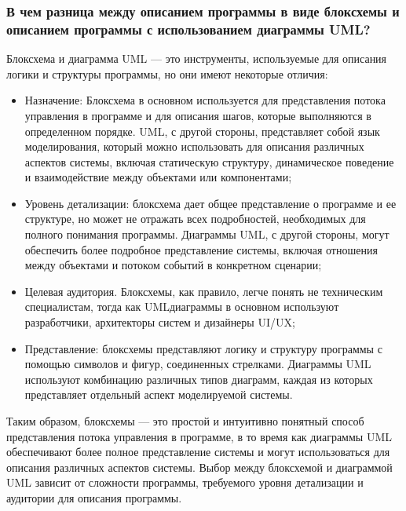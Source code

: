\documentclass[letterpaper,10pt,russian]{sphinxmanual}
\begin{document}
\subsubsection{В чем разница между описанием программы в виде блок\sphinxhyphen{}схемы и описанием программы с использованием диаграммы UML?}
\label{\detokenize{educational_materials/uml/content:id5}}
\sphinxAtStartPar
Блок\sphinxhyphen{}схема и диаграмма UML — это инструменты, используемые для описания логики и структуры программы, но они имеют некоторые отличия:
\begin{itemize}
\item {} 
\sphinxAtStartPar
Назначение: Блок\sphinxhyphen{}схема в основном используется для представления потока управления в программе и для описания шагов, которые выполняются в определенном порядке. UML, с другой стороны, представляет собой язык моделирования, который можно использовать для описания различных аспектов системы, включая статическую структуру, динамическое поведение и взаимодействие между объектами или компонентами;

\item {} 
\sphinxAtStartPar
Уровень детализации: блок\sphinxhyphen{}схема дает общее представление о программе и ее структуре, но может не отражать всех подробностей, необходимых для полного понимания программы. Диаграммы UML, с другой стороны, могут обеспечить более подробное представление системы, включая отношения между объектами и потоком событий в конкретном сценарии;

\item {} 
\sphinxAtStartPar
Целевая аудитория. Блок\sphinxhyphen{}схемы, как правило, легче понять не техническим специалистам, тогда как UML\sphinxhyphen{}диаграммы в основном используют разработчики, архитекторы систем и дизайнеры UI/UX;

\item {} 
\sphinxAtStartPar
Представление: блок\sphinxhyphen{}схемы представляют логику и структуру программы с помощью символов и фигур, соединенных стрелками. Диаграммы UML используют комбинацию различных типов диаграмм, каждая из которых представляет отдельный аспект моделируемой системы.

\end{itemize}

\sphinxAtStartPar
Таким образом, блок\sphinxhyphen{}схемы — это простой и интуитивно понятный способ представления потока управления в программе, в то время как диаграммы UML обеспечивают более полное представление системы и могут использоваться для описания различных аспектов системы. Выбор между блок\sphinxhyphen{}схемой и диаграммой UML зависит от сложности программы, требуемого уровня детализации и аудитории для описания программы.
\end{document}
